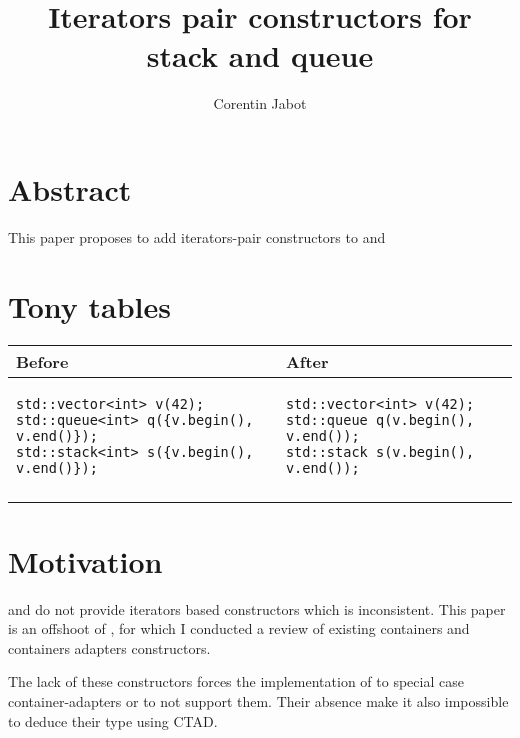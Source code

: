 \documentclass{wg21}
\title{Iterators pair constructors for stack and queue}
\author{Corentin Jabot}{corentin.jabot@gmail.com}
\begin{document}
\maketitle

\section{Abstract}

This paper proposes to add iterators-pair constructors to  and 

\section{Tony tables}
\begin{center}
\begin{tabular}{l|l}
Before & After\\ \hline

\begin{minipage}[t]{0.5\textwidth}
\begin{lstlisting}
std::vector<int> v(42);
std::queue<int> q({v.begin(), v.end()});
std::stack<int> s({v.begin(), v.end()});
\end{lstlisting}
\end{minipage}
&
\begin{minipage}[t]{0.3\textwidth}
\begin{lstlisting}
std::vector<int> v(42);
std::queue q(v.begin(), v.end());
std::stack s(v.begin(), v.end());
\end{lstlisting}
\end{minipage}
\\\\ \hline

\end{tabular}
\end{center}


\section{Motivation}

 and  do not provide iterators based constructors which is inconsistent.
This paper is an offshoot of \cite{P1206}, for which I conducted a review of existing containers and containers adapters constructors.

The lack of these constructors forces the implementation of  to special case container-adapters or to not support them.
Their absence make it also impossible to deduce their type using CTAD.
\end{document}
